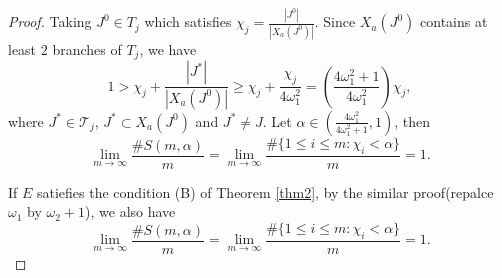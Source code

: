 \documentclass[10pt,a4paper]{amsart}
\begin{document}
\begin{proof}
Taking $J^0\in T_j$ which satisfies $\chi_j=\frac{\left | J^0 \right |}{\left |X_a(J^0) \right |} $.
Since $X_a(J^0)$  contains at least $2$ branches of $T_j$, we have
\begin{equation*}
1>\chi_j+\frac{\left | J^* \right |}{\left |X_a(J^0) \right |}\ge \chi_j+\frac{\chi_j}{4\omega_1^2}=(\frac{4\omega_1^2+1}{4\omega_1^2} )\chi_j,
\end{equation*}
where $J^*\in \mathcal{T}_j$, $J^*\subset X_a(J^0)$ and $J^*\neq J$. Let $\alpha \in (\frac{4\omega_1^2}{4\omega_1^2+1},1)$, then
\begin{equation*}
\lim_{m\to \infty} \frac{\#S(m,\alpha )}{m} =\lim_{m\to \infty}\frac{\#\{1\le i\le m:\chi_i<\alpha\}}{m} =1.
\end{equation*}


If $E$ satiefies the condition {\rm(B)} of Theorem {\rm\ref{thm2}},
 by the similar proof(repalce $\omega_1$ by $\omega_2+1$), we also have
\begin{equation*}
\lim_{m\to \infty} \frac{\#S(m,\alpha )}{m} =\lim_{m\to \infty} \frac{\#\{1\le i\le m:\chi_i<\alpha\}}{m} =1.
\end{equation*}





\end{proof}
\end{document}
